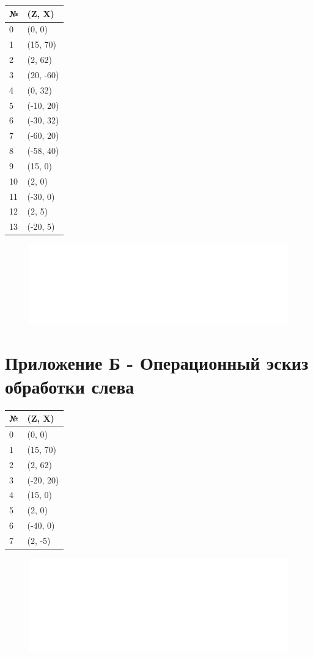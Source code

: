 \begin{sideways}
    \begin{tabular}{ll}
        \textbf{№} & \textbf{(Z, X)}\\
        \hline
        0 & (0, 0)\\
        1 & (15, 70)\\
        2 & (2, 62)\\
        3 & (20, -60)\\
        4 & (0, 32)\\
        5 & (-10, 20)\\
        6 & (-30, 32)\\
        7 & (-60, 20)\\
        8 & (-58, 40)\\
        9 & (15, 0)\\
        10 & (2, 0)\\
        11 & (-30, 0)\\
        12 & (2, 5)\\
        13 & (-20, 5)
    \end{tabular}
\end{sideways}

\begin{figure}[ht]
    \includegraphics[width=.8\linewidth, angle=90]{Figures/sketch1.png}
    \label{fig:sketch2}
\end{figure}

\section*{Приложение Б - Операционный эскиз обработки слева}

\begin{sideways}
    \begin{tabular}{ll}
        \textbf{№} & \textbf{(Z, X)}\\
        \hline
        0 & (0, 0)\\
        1 & (15, 70)\\
        2 & (2, 62)\\
        3 & (-20, 20)\\
        4 & (15, 0)\\
        5 & (2, 0)\\
        6 & (-40, 0)\\
        7 & (2, -5)\\
    \end{tabular}
\end{sideways}

\begin{figure}[ht]
    \includegraphics[width=.8\linewidth, angle=90]{Figures/sketch2.png}
    \label{fig:sketch2}
\end{figure}
